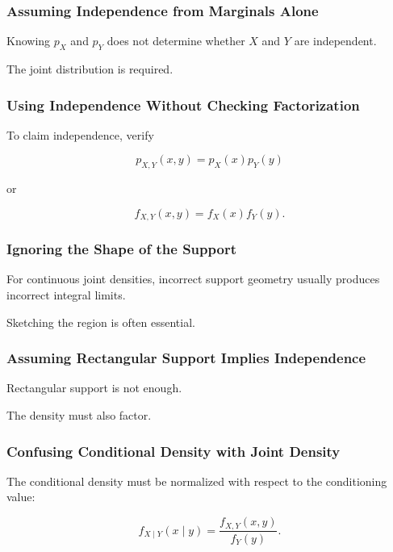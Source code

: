 \subsubsection{Assuming Independence from Marginals Alone}

Knowing \(p_X\) and \(p_Y\) does not determine whether \(X\) and \(Y\)
are independent.

The joint distribution is required.

\subsubsection{Using Independence Without Checking Factorization}

To claim independence, verify

\[
p_{X,Y}(x,y)=p_X(x)p_Y(y)
\]

or

\[
f_{X,Y}(x,y)=f_X(x)f_Y(y).
\]

\subsubsection{Ignoring the Shape of the Support}

For continuous joint densities, incorrect support geometry usually
produces incorrect integral limits.

Sketching the region is often essential.

\subsubsection{Assuming Rectangular Support Implies Independence}

Rectangular support is not enough.

The density must also factor.

\subsubsection{Confusing Conditional Density with Joint Density}

The conditional density must be normalized with respect to the
conditioning value:

\[
f_{X\mid Y}(x\mid y)
=
\frac{
f_{X,Y}(x,y)
}{
f_Y(y)
}.
\]

